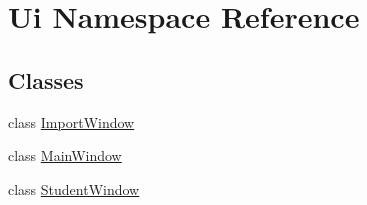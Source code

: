 \hypertarget{namespace_ui}{}\section{Ui Namespace Reference}
\label{namespace_ui}
\subsection*{Classes}
\begin{DoxyCompactItemize}
\item 
class \hyperlink{class_ui_1_1_import_window}{Import\+Window}
\item 
class \hyperlink{class_ui_1_1_main_window}{Main\+Window}
\item 
class \hyperlink{class_ui_1_1_student_window}{Student\+Window}
\end{DoxyCompactItemize}
